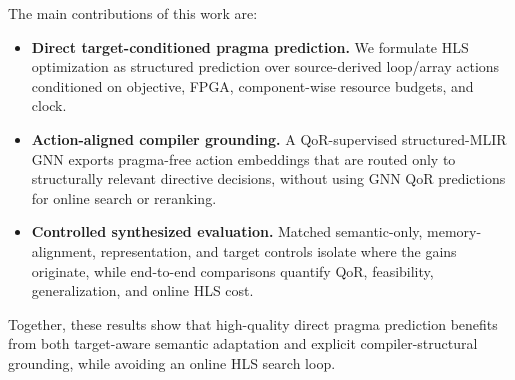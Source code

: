 


The main contributions of this work are:

\begin{itemize}[leftmargin=*,topsep=2pt,itemsep=2pt]
\item \textbf{Direct target-conditioned pragma prediction.}
We formulate HLS optimization as structured prediction over
source-derived loop/array actions conditioned on objective, FPGA,
component-wise resource budgets, and clock.

\item \textbf{Action-aligned compiler grounding.}
A QoR-supervised structured-MLIR GNN exports pragma-free action
embeddings that are routed only to structurally relevant directive
decisions, without using GNN QoR predictions for online search or
reranking.

\item \textbf{Controlled synthesized evaluation.}
Matched semantic-only, memory-alignment, representation, and target
controls isolate where the gains originate, while end-to-end
comparisons quantify QoR, feasibility, generalization, and online
HLS cost.
\end{itemize}

Together, these results show that high-quality direct pragma prediction
benefits from both target-aware semantic adaptation and explicit compiler-structural grounding, while avoiding an online HLS search loop.
